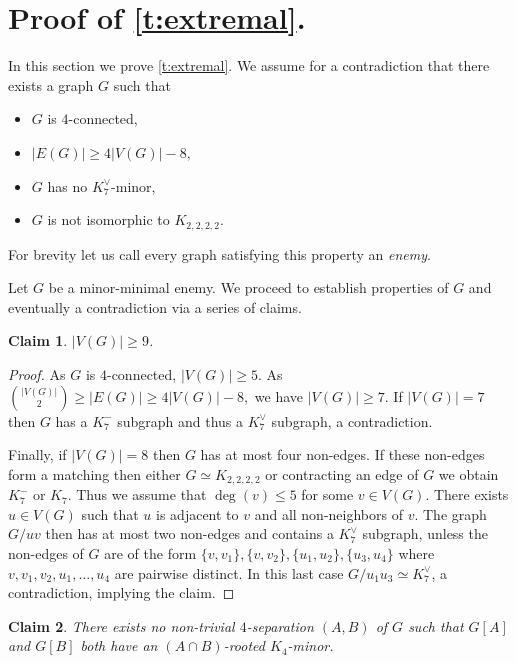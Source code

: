 \documentclass[reqno,final,12pt]{amsart}
\newtheorem{claim}{Claim}[section]
\begin{document}
{	
\section {Proof of \cref{t:extremal}.}\label{s:extremal}
	
In this section we prove \cref{t:extremal}. We assume for a contradiction that there exists a graph $G$ such that 
\begin{itemize}
	\item $G$ is $4$-connected,
	\item $|E(G)| \geq  4|V(G)| - 8,$
	\item $G$ has no $K_7^{\vee}$-minor,
	\item $G$ is not isomorphic to $K_{2,2,2,2}$.
\end{itemize}
For brevity let us call every graph satisfying this property an \emph{enemy}. 

Let $G$ be a minor-minimal enemy. We proceed to establish properties of $G$ and eventually a contradiction via a series of claims.

\begin{claim}\label{c:vertexnumber} $|V(G)| \geq 9$.\end{claim}	
\begin{proof}
As $G$ is $4$-connected, $|V(G)| \geq 5$. As  $\binom{|V(G)|}{2} \geq |E(G)| \geq  4|V(G)| - 8,$ we have $|V(G)| \geq 7$. If $|V(G)|=7$ then $G$ has a $K^-_7$ subgraph and thus a $K_7^{\vee}$ subgraph, a contradiction.

Finally, if $|V(G)|=8$ then  $G$ has at most four non-edges. If these non-edges form a matching then either  $G \simeq K_{2,2,2,2}$ or contracting an edge of $G$ we obtain $K^-_7$ or $K_7$. Thus we assume that $\deg(v) \leq 5$ for some $v \in V(G)$.  There exists  $u \in V(G)$ such that $u$ is adjacent to $v$ and all non-neighbors of $v$. The graph $G / uv$ then has at most two non-edges and contains a   $K_7^{\vee}$ subgraph, unless the non-edges of $G$ are of the form $\{v,v_1\},\{v,v_2\},\{u_1,u_2\},\{u_3,u_4\}$ where $v,v_1,v_2,u_1,\ldots,u_4$ are pairwise distinct. In this last case $G / u_1u_3 \simeq K_7^{\vee}$, a contradiction, implying the claim. 
\end{proof}	



	
\begin{claim}\label{c:no4sep2K4} There exists no non-trivial $4$-separation $(A,B)$ of $G$ such that $G[A]$ and $G[B]$ both have an $(A \cap B)$-rooted $K_4$-minor.
\end{claim}	

}
\end{document}
